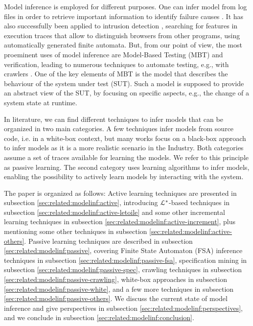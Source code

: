 Model inference is employed for different purposes. One can infer
model from log files in order to retrieve important information
to identify failure causes \cite{4700316}. It has also
successfully been applied to intrusion detection \cite{debar00},
searching for features in execution traces that allow to
distinguish browsers from other programs, using automatically
generated finite automata.
But, from our point of view, the most proeminent uses of model
inference are Model-Based Testing (MBT) and verification, leading
to numerous techniques to automate testing, e.g., with crawlers
\cite{Amalfitano:2012:UGR:2351676.2351717,Joorabchi:2012:REI:2420240.2420457,MobiGUITARIEEESoftware2014}.
One of the key elements of MBT is the model that describes the
behaviour of the system under test (SUT). Such a model is
supposed to provide an abstract view of the SUT, by focusing on
specific aspects, e.g., the change of a system state at runtime.

In literature, we can find different techniques to infer models
that can be organized in two main categories. A few techniques
infer models from source code, i.e. in a white-box context, but
many works focus on a black-box approach to infer models as it is
a more realistic scenario in the Industry. Both categories assume
a set of traces available for learning the models. We refer to
this principle as passive learning. The second category uses
learning algorithms to infer models, enabling the possibility to
actively learn models by interacting with the system.

The paper is organized as follows: Active learning techniques are
presented in subsection \ref{sec:related:modelinf:active}, introducing
$\EuScript{L}^*$-based techniques in subsection
\ref{sec:related:modelinf:active-letoile} and some other incremental learning
techniques in subsection \ref{sec:related:modelinf:active-increment}, plus mentioning
some other techniques in subsection \ref{sec:related:modelinf:active-others}.
Passive learning techniques are described in subsection
\ref{sec:related:modelinf:passive}, covering Finite State Automaton (FSA)
inference techniques in subsection \ref{sec:related:modelinf:passive-fsa},
specification mining in subsection \ref{sec:related:modelinf:passive-spec}, crawling
techniques in subsection \ref{sec:related:modelinf:passive-crawling}, white-box
approaches in subsection \ref{sec:related:modelinf:passive-white}, and a few more
techniques in subsection \ref{sec:related:modelinf:passive-others}.
We discuss the current state of model inference and give
perspectives in subsection \ref{sec:related:modelinf:perspectives}, and we conclude
in subsection \ref{sec:related:modelinf:conclusion}.


